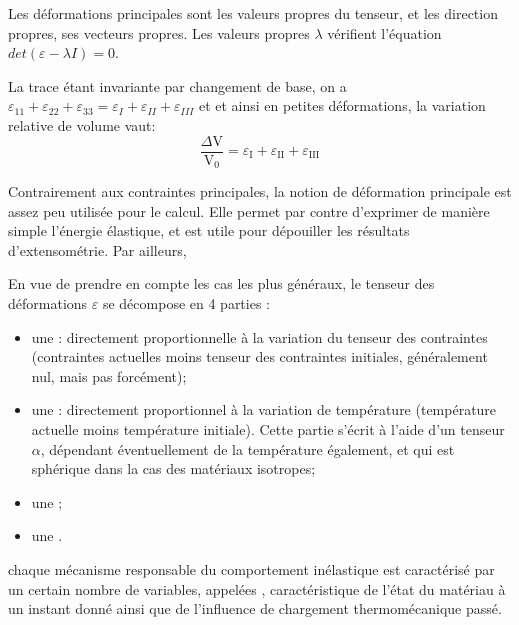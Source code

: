 Les déformations principales sont les valeurs propres du tenseur, et les direction propres, ses vecteurs propres. 
Les valeurs propres $\lambda$ vérifient l'équation $det(\varepsilon - \lambda I) = 0$.

 La trace étant invariante par changement de base, on a $\varepsilon_{11}+\varepsilon_{22}+\varepsilon_{33}
=\varepsilon_{I}+\varepsilon_{II}+\varepsilon_{III}$ et et ainsi en petites déformations, la variation relative 
de volume vaut:
\begin{equation}
    \frac{\Delta \mathrm{V}}{\mathrm{V}_0} = \varepsilon_\mathrm{I} + \varepsilon_\mathrm{II} + \varepsilon_\mathrm{III}
\end{equation}

Contrairement aux contraintes principales, la notion de déformation principale est assez peu utilisée pour le calcul. 
Elle permet par contre d'exprimer de manière simple l'énergie élastique, et est utile pour dépouiller les 
résultats d'extensométrie. 
Par ailleurs, 


\bigskip
En vue de prendre en compte les cas les plus généraux, le tenseur des déformations $\varepsilon$ 
se décompose en 4 parties :
\begin{itemize}
	\item une : directement proportionnelle à la variation du tenseur
		des contraintes (contraintes actuelles moins tenseur des contraintes initiales, généralement
		nul, mais pas forcément);
	\item une : directement proportionnel à la variation de
		température (température actuelle moins température initiale). Cette partie
		s'écrit à l'aide d'un tenseur $\alpha$, dépendant éventuellement de la
		température également, et qui est sphérique dans la cas des matériaux isotropes;
	\item une ;
	\item une .
\end{itemize}

\medskip
chaque mécanisme responsable du comportement inélastique est caractérisé par un certain
nombre de variables, appelées , caractéristique de l'état 
du matériau à un instant donné ainsi que de l'influence de chargement thermomécanique passé.

